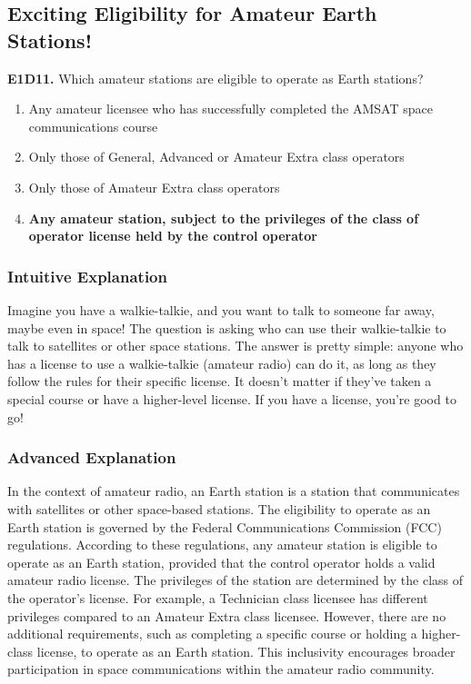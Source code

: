 \subsection{Exciting Eligibility for Amateur Earth Stations!}

\begin{tcolorbox}[colback=gray!10!white,colframe=black!75!black,title=E1D11]
\textbf{E1D11.} Which amateur stations are eligible to operate as Earth stations?
\begin{enumerate}[label=\Alph*.]
    \item Any amateur licensee who has successfully completed the AMSAT space communications course
    \item Only those of General, Advanced or Amateur Extra class operators
    \item Only those of Amateur Extra class operators
    \item \textbf{Any amateur station, subject to the privileges of the class of operator license held by the control operator}
\end{enumerate}
\end{tcolorbox}

\subsubsection{Intuitive Explanation}
Imagine you have a walkie-talkie, and you want to talk to someone far away, maybe even in space! The question is asking who can use their walkie-talkie to talk to satellites or other space stations. The answer is pretty simple: anyone who has a license to use a walkie-talkie (amateur radio) can do it, as long as they follow the rules for their specific license. It doesn’t matter if they’ve taken a special course or have a higher-level license. If you have a license, you’re good to go!

\subsubsection{Advanced Explanation}
In the context of amateur radio, an Earth station is a station that communicates with satellites or other space-based stations. The eligibility to operate as an Earth station is governed by the Federal Communications Commission (FCC) regulations. According to these regulations, any amateur station is eligible to operate as an Earth station, provided that the control operator holds a valid amateur radio license. The privileges of the station are determined by the class of the operator’s license. For example, a Technician class licensee has different privileges compared to an Amateur Extra class licensee. However, there are no additional requirements, such as completing a specific course or holding a higher-class license, to operate as an Earth station. This inclusivity encourages broader participation in space communications within the amateur radio community.

